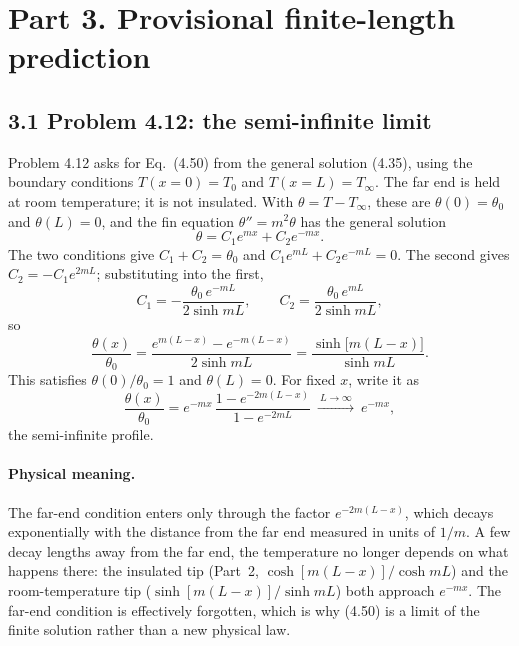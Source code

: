 \documentclass[reprint, amsmath, amssymb, aps, prl]{revtex4-2}
\begin{document}
\section*{Part 3. Provisional finite-length prediction}

\subsection*{3.1 Problem 4.12: the semi-infinite limit}

Problem 4.12 asks for Eq.~(4.50) from the general solution (4.35), using the boundary
conditions $T(x=0)=T_0$ and $T(x=L)=T_\infty$. The far end is held at room temperature;
it is not insulated. With $\theta=T-T_\infty$, these are $\theta(0)=\theta_0$ and
$\theta(L)=0$, and the fin equation $\theta''=m^2\theta$ has the general solution
\begin{equation*}
\theta=C_1e^{mx}+C_2e^{-mx}.
\end{equation*}
The two conditions give $C_1+C_2=\theta_0$ and $C_1e^{mL}+C_2e^{-mL}=0$. The second gives
$C_2=-C_1e^{2mL}$; substituting into the first,
\begin{equation*}
C_1=-\frac{\theta_0\,e^{-mL}}{2\sinh mL},
\qquad
C_2=\frac{\theta_0\,e^{mL}}{2\sinh mL},
\end{equation*}
so
\begin{equation*}
\frac{\theta(x)}{\theta_0}
=\frac{e^{m(L-x)}-e^{-m(L-x)}}{2\sinh mL}
=\frac{\sinh\big[m(L-x)\big]}{\sinh mL}.
\end{equation*}
This satisfies $\theta(0)/\theta_0=1$ and $\theta(L)=0$. For fixed $x$, write it as
\begin{equation}
\frac{\theta(x)}{\theta_0}
=e^{-mx}\,\frac{1-e^{-2m(L-x)}}{1-e^{-2mL}}
\ \xrightarrow{\ L\to\infty\ }\
e^{-mx},
\tag{4.50}
\end{equation}
the semi-infinite profile.

\paragraph*{Physical meaning.}
The far-end condition enters only through the factor $e^{-2m(L-x)}$, which decays
exponentially with the distance from the far end measured in units of $1/m$. A few decay
lengths away from the far end, the temperature no longer depends on what happens there:
the insulated tip (Part~2, $\cosh[m(L-x)]/\cosh mL$) and the room-temperature tip
($\sinh[m(L-x)]/\sinh mL$) both approach $e^{-mx}$. The far-end condition is effectively
forgotten, which is why (4.50) is a limit of the finite solution rather than a new
physical law.
\end{document}
